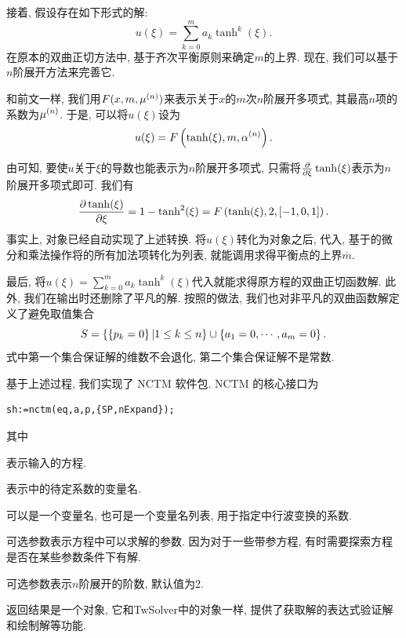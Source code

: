 接着, 假设存在如下形式的解:
\begin{equation}
    u(\xi)=\sum_{k=0}^m{a_k \tanh^k(\xi)}. \label{tanh-poly}
\end{equation}
在原本的双曲正切方法中, 基于齐次平衡原则来确定$m$的上界. 现在, 我们可以基于$n$阶展开方法来完善它. 

和前文一样, 我们用$F(x,m,\mu^{(n)})$来表示关于$x$的$m$次$n$阶展开多项式, 其最高$n$项的系数为$\mu^{(n)}$. 于是, 可以将$u(\xi)$设为
\begin{equation}
    u(\xi)=F\left(\tanh(\xi),m,\alpha^{(n)}\right).
\end{equation}

由可知, 要使$u$关于$\xi$的导数也能表示为$n$阶展开多项式, 只需将$\frac{\partial}{\partial \xi}\tanh(\xi)$表示为$n$阶展开多项式即可. 我们有 
\begin{equation}
    \frac{\partial \tanh(\xi)}{\partial \xi}=1-\tanh^2(\xi)=F\left(\tanh(\xi),2,[-1,0,1]\right).
\end{equation}
事实上, 对象已经自动实现了上述转换. 将$u(\xi)$转化为对象之后, 代入, 基于的微分和乘法操作将的所有加法项转化为列表, 就能调用求得平衡点的上界$\overline{m}$.

最后, 将$u(\xi)=\sum_{k=0}^{\overline{m}}{a_k \tanh^k(\xi)}$代入就能求得原方程的双曲正切函数解.  此外, 我们在输出时还删除了平凡的解. 按照的做法, 我们也对非平凡的双曲函数解定义了避免取值集合
\begin{equation}
    S=\left\{\left\{p_k=0\right\}|1\le k \le n\right\} \cup \left\{a_1=0,\cdots,a_m=0\right\}.
\end{equation}
式中第一个集合保证解的维数不会退化, 第二个集合保证解不是常数. 

基于上述过程, 我们实现了 NCTM 软件包. NCTM 的核心接口为
\begin{verbatim}
sh:=nctm(eq,a,p,{SP,nExpand});
\end{verbatim}
其中
\begin{compactitem}[\textbullet]
\item {} 表示输入的方程.
\item {} 表示中的待定系数的变量名.
\item {} 可以是一个变量名, 也可是一个变量名列表, 用于指定中行波变换的系数.
\item 可选参数表示方程中可以求解的参数. 因为对于一些带参方程, 有时需要探索方程是否在某些参数条件下有解.
\item 可选参数表示$n$阶展开的阶数, 默认值为2.
\item 返回结果是一个对象, 它和TwSolver中的对象一样, 提供了获取解的表达式\D 验证解和绘制解等功能. 
\end{compactitem}

